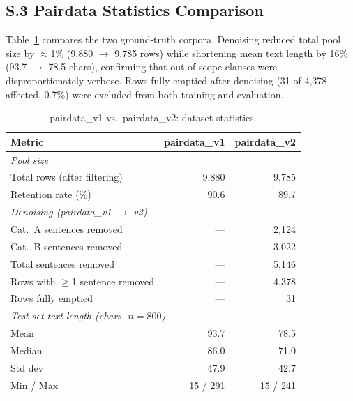 ﻿\documentclass[onecolumn]{article}
\begin{document}
\subsection*{S.3 Pairdata Statistics Comparison}
\label{sec:pairdata_comparison}

Table~\ref{tab:pairdata_stats} compares the two ground-truth corpora.
Denoising reduced total pool size by $\approx$1\% (9,880 $\to$ 9,785 rows)
while shortening mean text length by 16\% (93.7 $\to$ 78.5 chars),
confirming that out-of-scope clauses were disproportionately verbose.
Rows fully emptied after denoising (31 of 4,378 affected, 0.7\%) were
excluded from both training and evaluation.

\begin{table}[h]
\centering
\caption{pairdata\_v1 vs.\ pairdata\_v2: dataset statistics.}
\label{tab:pairdata_stats}
\small
\begin{tabular}{l r r}
\toprule
\textbf{Metric} & \textbf{pairdata\_v1} & \textbf{pairdata\_v2} \\
\midrule
\multicolumn{3}{l}{\textit{Pool size}} \\
\quad Total rows (after filtering) & 9,880 & 9,785 \\
\quad Retention rate (\%) & 90.6 & 89.7 \\
\midrule
\multicolumn{3}{l}{\textit{Denoising (pairdata\_v1 $\to$ v2)}} \\
\quad Cat.\ A sentences removed & --- & 2,124 \\
\quad Cat.\ B sentences removed & --- & 3,022 \\
\quad Total sentences removed & --- & 5,146 \\
\quad Rows with $\geq$1 sentence removed & --- & 4,378 \\
\quad Rows fully emptied & --- & 31 \\
\midrule
\multicolumn{3}{l}{\textit{Test-set text length (chars, $n=800$)}} \\
\quad Mean & 93.7 & 78.5 \\
\quad Median & 86.0 & 71.0 \\
\quad Std dev & 47.9 & 42.7 \\
\quad Min / Max & 15 / 291 & 15 / 241 \\
\bottomrule
\end{tabular}
\end{table}

\end{document}
